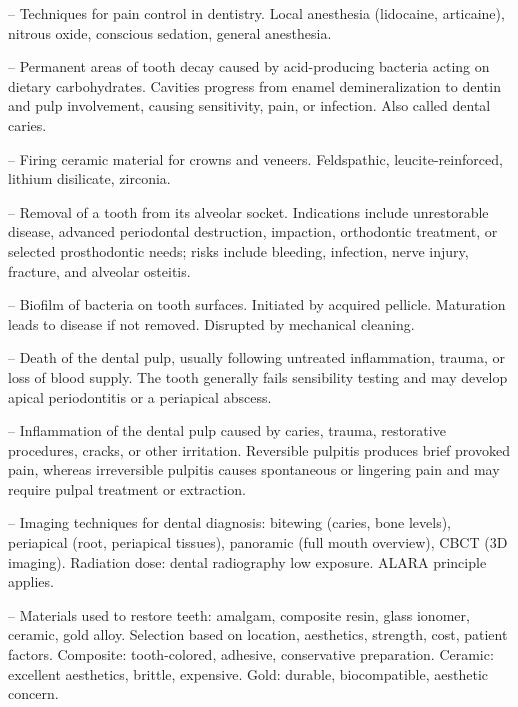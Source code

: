 -- Techniques for pain control in dentistry. Local anesthesia (lidocaine, articaine), nitrous oxide, conscious sedation, general anesthesia.

-- Permanent areas of tooth decay caused by acid-producing bacteria acting on dietary carbohydrates. Cavities progress from enamel demineralization to dentin and pulp involvement, causing sensitivity, pain, or infection. Also called dental caries.

-- Firing ceramic material for crowns and veneers. Feldspathic, leucite-reinforced, lithium disilicate, zirconia.

-- Removal of a tooth from its alveolar socket. Indications include unrestorable disease, advanced periodontal destruction, impaction, orthodontic treatment, or selected prosthodontic needs; risks include bleeding, infection, nerve injury, fracture, and alveolar osteitis.

-- Biofilm of bacteria on tooth surfaces. Initiated by acquired pellicle. Maturation leads to disease if not removed. Disrupted by mechanical cleaning.

-- Death of the dental pulp, usually following untreated inflammation, trauma, or loss of blood supply. The tooth generally fails sensibility testing and may develop apical periodontitis or a periapical abscess.

-- Inflammation of the dental pulp caused by caries, trauma, restorative procedures, cracks, or other irritation. Reversible pulpitis produces brief provoked pain, whereas irreversible pulpitis causes spontaneous or lingering pain and may require pulpal treatment or extraction.

-- Imaging techniques for dental diagnosis: bitewing (caries, bone levels), periapical (root, periapical tissues), panoramic (full mouth overview), CBCT (3D imaging). Radiation dose: dental radiography low exposure. ALARA principle applies.

-- Materials used to restore teeth: amalgam, composite resin, glass ionomer, ceramic, gold alloy. Selection based on location, aesthetics, strength, cost, patient factors. Composite: tooth-colored, adhesive, conservative preparation. Ceramic: excellent aesthetics, brittle, expensive. Gold: durable, biocompatible, aesthetic concern.

